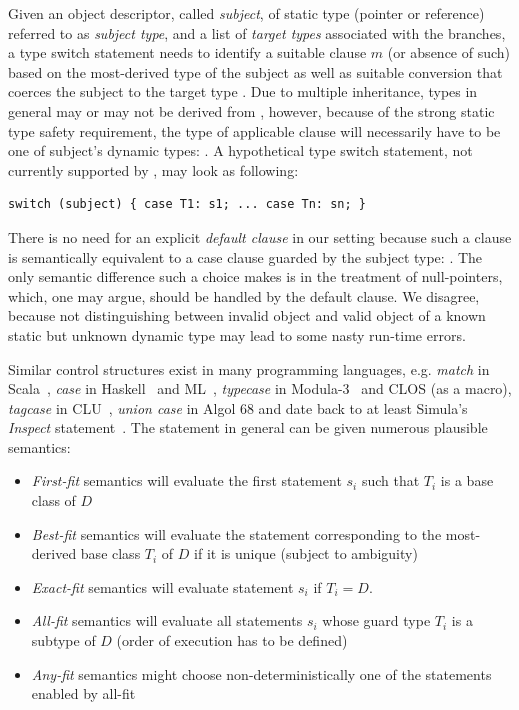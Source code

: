 Given an object descriptor, called \emph{subject}, of static type  
(pointer or reference) referred to as \emph{subject type}, and a list of 
\emph{target types}  associated with the branches, a type switch 
statement needs to identify a suitable clause $m$ (or absence of such) based on 
the most-derived type  of the subject as well as suitable 
conversion that coerces the subject to the target type .  
Due to multiple inheritance, types  in general may or may not be 
derived from , however, because of the strong static type safety 
requirement, the type of applicable clause  will necessarily have to be 
one of subject's dynamic types: . A hypothetical type switch 
statement, not currently supported by \Cpp{}, may look as following:

\begin{lstlisting}[keepspaces]
switch (subject) { case T1: s1; ... case Tn: sn; }
\end{lstlisting}

\noindent
There is no need for an explicit \emph{default clause} in our setting because 
such a clause is semantically equivalent to a case clause guarded by the 
subject type: . The only semantic difference such a choice 
makes is in the treatment of null-pointers, which, one may argue, should be 
handled by the default clause. We disagree, because not distinguishing between 
invalid object and valid object of a known static but unknown dynamic type may 
lead to some nasty run-time errors.

Similar control structures exist in many programming languages, e.g. 
\emph{match} in Scala~\cite{Scala2nd}, \emph{case} in Haskell~\cite{Haskell98Book} and 
ML~\cite{ML90}, \emph{typecase} in Modula-3~\cite{Modula3TS} and CLOS (as a 
macro), \emph{tagcase} in CLU~\cite{CLURefMan}, \emph{union case} in Algol 68 
and date back to at least Simula's \emph{Inspect} statement~\cite{Simula67}. 
The statement in general can be given numerous plausible semantics:

\begin{itemize}
\setlength{\itemsep}{0pt}
\setlength{\parskip}{0pt}
\item \emph{First-fit} semantics will evaluate the first statement $s_i$ such 
      that $T_i$ is a base class of $D$
\item \emph{Best-fit} semantics will evaluate the statement corresponding to the 
      most-derived base class $T_i$ of $D$ if it is unique (subject to 
      ambiguity)
\item \emph{Exact-fit} semantics will evaluate statement $s_i$ if $T_i=D$.
\item \emph{All-fit} semantics will evaluate all statements $s_i$ whose guard 
      type $T_i$ is a subtype of $D$ (order of execution has to be defined)
\item \emph{Any-fit} semantics might choose non-deterministically one of the 
      statements enabled by all-fit
\end{itemize}

